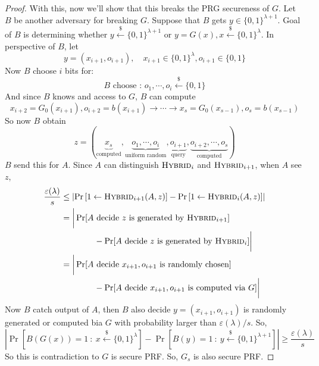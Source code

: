 \documentclass[12pt, a4paper, openany, twoside]{book}
\theoremstyle{definition}
\theoremstyle{remark}
\theoremstyle{plain}
\numberwithin{equation}{section}
\begin{document}
\begin{proof}
With this, now we'll show that this breaks the PRG secureness of $G$. Let $B$ be another 
adversary for breaking $G$. Suppose that $B$ gets $y \in \{0, 1\}^{\lambda + 1}$. Goal of $B$ is determining whether 
$y \xleftarrow{\$} \{0, 1\}^{\lambda + 1}$ or $y = G(x), x \xleftarrow{\$} \{0, 1\}^\lambda$. 
In perspective of $B$, let 
\[y = (x_{i+1}, o_{i+1}), \quad x_{i+1} \in \{0, 1\}^{\lambda}, o_{i+1} \in \{0, 1\}\]
Now $B$ choose $i$ bits for: 
\[\text{$B$ choose : } o_1, \cdots, o_i \xleftarrow{\$} \{0, 1\}\]
And since $B$ knows and access to $G$, $B$ can compute 
\[x_{i+2} = G_0(x_{i+1}), o_{i+2} = b(x_{i+1}) \rightarrow \cdots \rightarrow x_{s} = G_0(x_{s-1}), o_s = b(x_{s-1})\]
So now $B$ obtain 
\[z = (\underbrace{x_s}_{\text{computed}}, \underbrace{o_1, \cdots, o_i}_{\text{uniform random}}, \underbrace{o_{i+1}}_{\text{query}}, \underbrace{o_{i+2}, \cdots, o_{s}}_{\text{computed}})\]
$B$ send this for $A$. Since $A$ can distinguish $\textsc{Hybrid}_i$ and $\textsc{Hybrid}_{i+1}$, 
when $A$ see $z$, 
\begin{align*}
    \frac{\varepsilon(\lambda)}{s} & \leq \left|\Pr\left[1 \gets \textsc{Hybrid}_{i+1}(A, z)\right] - \Pr\left[1 \gets \textsc{Hybrid}_i(A, z)\right]\right| \\
    & =  \bigg|\Pr[A \text{ decide $z$ is generated by $\textsc{Hybrid}_{i+1}$}] \\
    & \qquad \qquad - \Pr[A \text{ decide $z$ is generated by $\textsc{Hybrid}_{i}$}] \bigg| \\
    &= \bigg|\Pr[A \text{ decide $x_{i+1}, o_{i+1}$ is randomly chosen}] \\
    & \qquad \qquad - \Pr[A \text{ decide $x_{i+1}, o_{i+1}$ is computed via $G$}] \bigg| \\
\end{align*}
Now $B$ catch output of $A$, then $B$ also decide $y = (x_{i+1}, o_{i+1})$ is randomly generated or 
computed bia $G$ with probability larger than $\varepsilon(\lambda)/s$. So, 
\[\left|\Pr[B(G(x)) = 1 ~:~ x \xleftarrow{\$} \{0, 1\}^\lambda] - \Pr[B(y) = 1 ~:~ y \xleftarrow{\$} \{0, 1\}^{\lambda + 1}]\right| \geq \frac{\varepsilon(\lambda)}{s}\]
So this is contradiction to $G$ is secure PRF. So, $G_s$ is also secure PRF. 
\end{proof}
\end{document}
